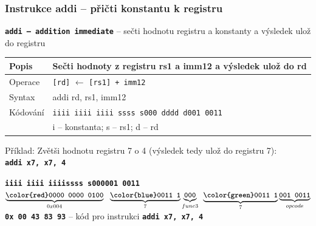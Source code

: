 \documentclass{beamer}
\begin{document}
\begin{frame}
\frametitle{Instrukce addi -- přičti konstantu k registru}

\textbf{\texttt{addi -- addition immediate}} -- sečti hodnotu registru a konstanty a výsledek ulož do registru

\bigskip

\begin{tabular}{|l|l|}\hline
Popis & Sečti hodnoty z registru rs1 a imm12 a výsledek ulož do rd \\ \hline
Operace & \texttt{[rd]} $\leftarrow$ \texttt{[rs1] + imm12} \\ \hline
Syntax & addi rd, rs1, imm12 \\ \hline
Kódování & \texttt{iiii iiii iiii ssss s000 dddd d001 0011} \\ 
 & i -- konstanta; s -- rs1; d -- rd \\ \hline
\end{tabular}

\bigskip

Příklad: Zvětši hodnotu registru 7 o 4 (výsledek tedy ulož do registru 7):\\
\textbf{\texttt{addi x7, x7, 4}}

\textbf{\texttt{\color{red}iiii iiii iiii}}\phantom{xx}\textbf{\texttt{\color{blue}ssss s}}\hspace{0.1cm}\textbf{\texttt{000\hspace{0.05cm}001 0011}}\\
$\underbrace{\textbf{\texttt{\color{red}0000 0000 0100}}}_{0x004}\texttt{ }\underbrace{\textbf{\texttt{\color{blue}0011 1}}}_{7}\underbrace{\textbf{\texttt{000}}}_{func3}\phantom{i}\underbrace{\textbf{\texttt{\color{green}0011 1}}}_{7}\underbrace{\textbf{\texttt{001 0011}}}_{opcode}$\\

\textbf{\texttt{0x 00 43 83 93}} -- kód pro instrukci \textbf{\texttt{addi x7, x7, 4}}


\end{frame}
\end{document}
